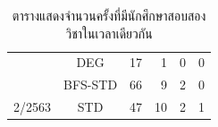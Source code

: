 \begin{table}[]
\begin{tabular}{@{}ccrrrr@{}}
                                  & {\color[HTML]{FE0000} DEG} & {\color[HTML]{FE0000} 17} & {\color[HTML]{FE0000} 1} & {\color[HTML]{FE0000} 0} & {\color[HTML]{FE0000} 0} \\ \cmidrule(l){2-6} 
                                  & BFS-STD                    & 66                        & 9                        & 2                        & 0                        \\ \cmidrule(l){2-6} 
    \multirow{-4}{*}{2/2563}      & STD                        & 47                        & 10                       & 2                        & 1                        \\ \bottomrule
    \end{tabular}
    \caption{ตารางแสดงจำนวนครั้งที่มีนักศึกษาสอบสองวิชาในเวลาเดียวกัน}
    \label{tab:overlap_count_result}
    \end{table}
